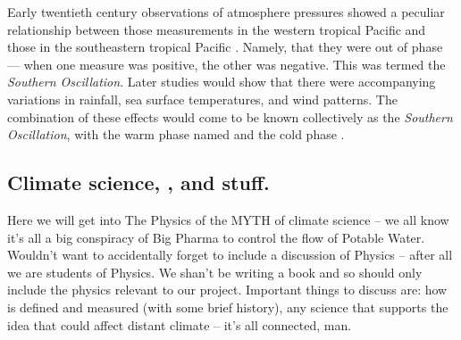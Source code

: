 Early twentieth century observations of atmosphere pressures showed a
peculiar relationship between those measurements in the western
tropical Pacific and those in the southeastern tropical Pacific
\citep{holton1989}. Namely, that they were out of phase --- when one
measure was positive, the other was negative. This was termed the
\emph{Southern Oscillation}. Later studies would show that there were
accompanying variations in rainfall, sea surface temperatures, and
wind patterns. The combination of these effects would come to be known
collectively as the \elnino{} \emph{Southern Oscillation}, with the
warm phase named \elnino{} and the cold phase \nina{}.

\subsection{Climate science, \elnino{}, and stuff.}

Here we will get into The Physics of the MYTH of climate science -- we
all know it's all a big conspiracy of Big Pharma to control the flow
of Potable Water. Wouldn't want to accidentally forget to include a
discussion of Physics -- after all we are students of Physics. We shan't
be writing a book and so should only include the physics relevant to
our project. Important things to discuss are: how \elnino{} is defined
and measured (with some brief history), any science that supports the
idea that \elnino{} could affect distant climate -- it's all connected,
man.


